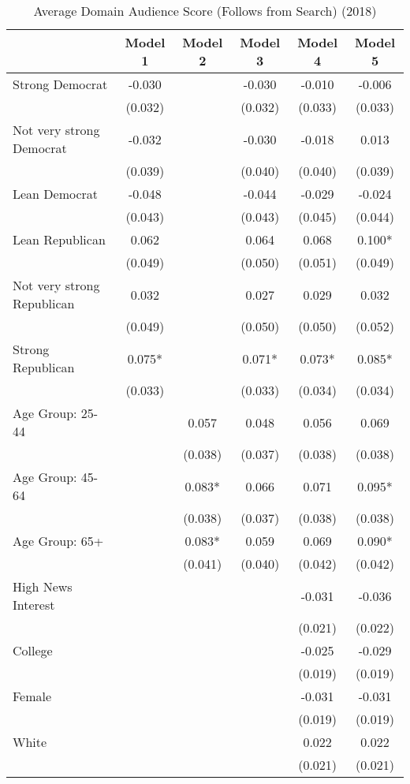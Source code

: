 \begin{table}

\caption{Average Domain Audience Score (Follows from Search) (2018)}
\centering
\begin{tabular}[t]{lccccc}
\toprule
  & Model 1 & Model 2 & Model 3 & Model 4 & Model 5\\
\midrule
Strong Democrat & -0.030 &  & -0.030 & -0.010 & -0.006\\
 & (0.032) &  & (0.032) & (0.033) & (0.033)\\
Not very strong Democrat & -0.032 &  & -0.030 & -0.018 & 0.013\\
 & (0.039) &  & (0.040) & (0.040) & (0.039)\\
Lean Democrat & -0.048 &  & -0.044 & -0.029 & -0.024\\
 & (0.043) &  & (0.043) & (0.045) & (0.044)\\
Lean Republican & 0.062 &  & 0.064 & 0.068 & 0.100*\\
 & (0.049) &  & (0.050) & (0.051) & (0.049)\\
Not very strong Republican & 0.032 &  & 0.027 & 0.029 & 0.032\\
 & (0.049) &  & (0.050) & (0.050) & (0.052)\\
Strong Republican & 0.075* &  & 0.071* & 0.073* & 0.085*\\
 & (0.033) &  & (0.033) & (0.034) & (0.034)\\
Age Group: 25-44 &  & 0.057 & 0.048 & 0.056 & 0.069\\
 &  & (0.038) & (0.037) & (0.038) & \vphantom{1} (0.038)\\
Age Group: 45-64 &  & 0.083* & 0.066 & 0.071 & 0.095*\\
 &  & (0.038) & (0.037) & (0.038) & (0.038)\\
Age Group: 65+ &  & 0.083* & 0.059 & 0.069 & 0.090*\\
 &  & (0.041) & (0.040) & (0.042) & (0.042)\\
High News Interest &  &  &  & -0.031 & -0.036\\
 &  &  &  & (0.021) & (0.022)\\
College &  &  &  & -0.025 & -0.029\\
 &  &  &  & (0.019) & \vphantom{1} (0.019)\\
Female &  &  &  & -0.031 & -0.031\\
 &  &  &  & (0.019) & (0.019)\\
White &  &  &  & 0.022 & 0.022\\
 &  &  &  & (0.021) & (0.021)\\

\end{tabular}
\end{table}
